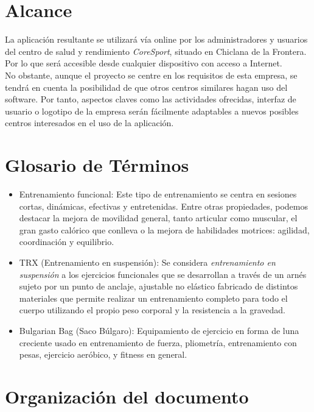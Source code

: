 \section{Alcance} 

La aplicación resultante se utilizará vía online por los administradores y usuarios del centro de salud y rendimiento \textsl{CoreSport}, situado en Chiclana de la Frontera. Por lo que será accesible desde cualquier dispositivo con acceso a Internet. 
\\

No obstante, aunque el proyecto se centre en los requisitos de esta empresa, se tendrá en cuenta la posibilidad de que otros centros similares hagan uso del software. Por tanto, aspectos claves como las actividades ofrecidas, interfaz de usuario o logotipo de la empresa serán fácilmente adaptables a nuevos posibles centros interesados en el uso de la aplicación. 


\section{Glosario de Términos} 

\begin{itemize} 
\item Entrenamiento funcional: Este tipo de entrenamiento se centra en sesiones cortas, dinámicas, efectivas y entretenidas. Entre otras propiedades, podemos destacar la mejora de movilidad general, tanto articular como muscular, el gran gasto calórico que conlleva o la mejora de habilidades motrices: agilidad, coordinación y equilibrio. 
\item TRX (Entrenamiento en suspensión):  Se considera \textsl{entrenamiento en suspensión} a los ejercicios funcionales que se desarrollan a través de un arnés sujeto por un punto de anclaje, ajustable no elástico fabricado de distintos materiales que permite realizar un entrenamiento completo para todo el cuerpo utilizando el propio peso corporal y la resistencia a la gravedad.
\item Bulgarian Bag (Saco Búlgaro): Equipamiento de ejercicio en forma de luna creciente usado en entrenamiento de fuerza, pliometría, entrenamiento con pesas, ejercicio aeróbico, y fitness en general.
\end {itemize}


\section{Organización del documento}

